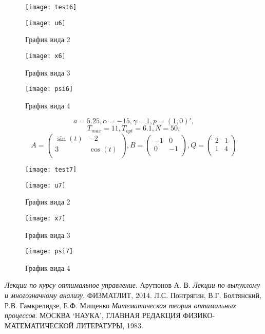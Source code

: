 \documentclass[11pt]{article}
\begin{document}
\begin{figure}[h!]
%
{\texttt{[image: test6]}}
\end{figure}

\begin{figure}\caption{График вида 2}
\centering
\texttt{[image: u6]}
\end{figure}

\begin{figure}\caption{График вида 3}
\centering
\texttt{[image: x6]}
\end{figure}

\begin{figure}\caption{График вида 4}
\centering
\texttt{[image: psi6]}
\end{figure}
\newpage

\[a = 5.25, \alpha = -15, \gamma = 1,  p = (1,0)',\] 
\[T_{max} = 11, T_{opt} = 6.1, N = 50,\]
\[
A = \left(
\begin{array}{cc}
\sin(t) & -2\\
3 & \cos(t)\\
\end{array}
\right),
B = \left(
\begin{array}{cc}
-1 & 0\\
0 & -1\\
\end{array}
\right),
Q = \left(
\begin{array}{cc}
2 & 1\\
1 & 4\\
\end{array}
\right)
\]

\begin{figure}[h!]
%
{\texttt{[image: test7]}}
\end{figure}

\begin{figure}\caption{График вида 2}
\centering
\texttt{[image: u7]}
\end{figure}

\begin{figure}\caption{График вида 3}
\centering
\texttt{[image: x7]}
\end{figure}

\begin{figure}\caption{График вида 4}
\centering
\texttt{[image: psi7]}
\end{figure}
\newpage




\newpage
\begin{thebibliography}{9}
 \emph{Лекции по курсу оптимальное управление}.
 Арутюнов А. В. \emph{Лекции по выпуклому и многозначному анализу}. ФИЗМАТЛИТ, 2014.
 Л.С. Понтрягин, В.Г. Болтянский, Р.В. Гамкрелидзе, Е.Ф. Мищенко \emph{Математическая теория оптимальных процессов}.
МОСКВА ‘НАУКА’, ГЛАВНАЯ РЕДАКЦИЯ ФИЗИКО-МАТЕМАТИЧЕСКОЙ ЛИТЕРАТУРЫ, 1983.


\end{thebibliography}
\end{document}
